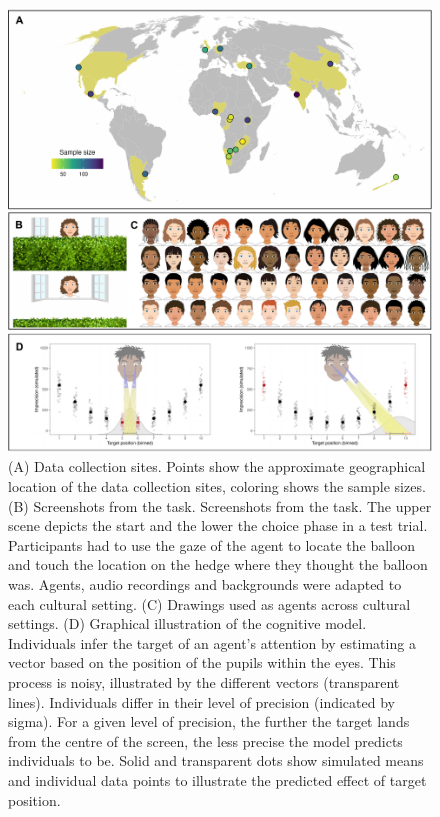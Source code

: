 \documentclass[
  man,floatsintext]{apa6}
\begin{document}
\begin{figure}

{\centering \includegraphics[width=0.75\linewidth]{../visuals/fig1} 

}

\caption{(A) Data collection sites. Points show the approximate geographical location of the data collection sites, coloring shows the sample sizes. (B) Screenshots from the task. Screenshots from the task. The upper scene depicts the start and the lower the choice phase in a test trial. Participants had to use the gaze of the agent to locate the balloon and touch the location on the hedge where they thought the balloon was. Agents, audio recordings and backgrounds were adapted to each cultural setting. (C) Drawings used as agents across cultural settings. (D) Graphical illustration of the cognitive model. Individuals infer the target of an agent’s attention by estimating a vector based on the position of the pupils within the eyes. This process is noisy, illustrated by the different vectors (transparent lines). Individuals differ in their level of precision (indicated by sigma). For a given level of precision, the further the target lands from the centre of the screen, the less precise the model predicts individuals to be. Solid and transparent dots show simulated means and individual data points to illustrate the predicted effect of target position.}\label{fig:fig1}
\end{figure}
\end{document}
